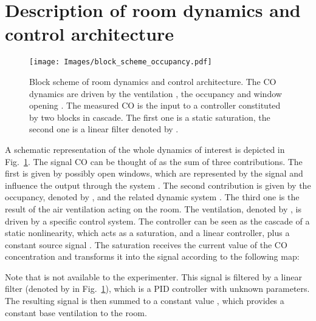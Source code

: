 \documentclass{article}
\begin{document}
\section{Description of room dynamics and control architecture}\label{sec:schematic}
\begin{figure}[htb]
\centering
\texttt{[image: Images/block\_scheme\_occupancy.pdf]}
\caption{Block scheme of room dynamics and control architecture. The CO dynamics are driven by the ventilation , the occupancy  and window opening . The measured CO is the input to a controller constituted by two blocks in cascade. The first one is a static saturation, the second one is a linear filter denoted by .}
\label{fig:block_scheme}
\end{figure}
A schematic representation of the whole dynamics of interest is depicted in
Fig.~\ref{fig:block_scheme}. The signal CO can be thought of as the sum
of three contributions. The first is given by possibly open windows, which are
represented by the signal  and influence the output through the system
. The second contribution is given by the occupancy, denoted by ,
and the related dynamic system . The third one is the result of the air
ventilation acting on the room. The ventilation, denoted by , is driven
by a specific control system. The controller can be seen as the cascade of a
static nonlinearity, which acts as a saturation, and a linear controller, plus
a constant source signal . The saturation receives the current value of
the CO concentration and transforms it into the signal  according to the
following map:

Note that  is not available to the experimenter. This signal is filtered
by a linear filter (denoted by  in Fig.~\ref{fig:block_scheme}), which is a
PID controller with unknown parameters. The resulting signal is then summed to
a constant value , which provides a constant base ventilation to the room.
\end{document}
